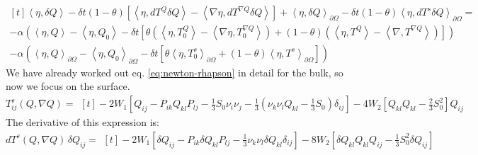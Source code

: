 \documentclass[reqno]{article}
\begin{document}
\begin{equation}
\begin{multlined}[t]
    \left<\eta, \delta Q\right> 
    - \delta t \left(1 - \theta \right) \left[
        \left<\eta, dT^Q \delta Q\right> 
        - \left<\nabla \eta, dT^{\nabla Q} \delta Q \right>
    \right] 
    + \left<\eta, \delta Q\right>_{\partial \Omega}
    - \delta t \left(1 - \theta \right) \left< \eta, dT^s \delta Q \right>_{\partial \Omega}
    = \\
    - \alpha \left( 
        \left<\eta, Q\right> - \left<\eta, Q_0\right> - \delta t \left[ 
            \theta \left(\left<\eta, T_0^Q\right> - \left<\nabla \eta, T_0^{\nabla Q} \right> \right)
            + \left(1 - \theta \right) \left( \left<\eta, T^Q\right> - \left<\nabla, T^{\nabla Q} \right> \right)
        \right]
    \right) \\
    -
    \alpha \left(
        \left<\eta, Q\right>_{\partial \Omega} 
            - \left< \eta, Q_0 \right>_{\partial \Omega} 
            - \delta t \left[ 
                \theta \left<\eta, T_0^s\right>_{\partial \Omega} 
                + \left(1 - \theta\right) \left< \eta, T^s \right>_{\partial \Omega} 
            \right] 
    \right)
\end{multlined}
\end{equation}
We have already worked out eq. \eqref{eq:newton-rhapson} in detail for the bulk, so now we focus on the surface.
\begin{equation}
    T^s_{ij}(Q, \nabla Q)
    =
    \begin{multlined}[t]
        -2 W_1 \left[
            Q_{ij} 
            - P_{ik} Q_{kl} P_{lj} 
            - \frac13 S_0 \nu_i \nu_j 
            - \frac13 \left( \nu_k \nu_l Q_{kl} - \frac13 S_0 \right) \delta_{ij}
        \right] 
        - 4 W_2 \left[ 
            Q_{kl} Q_{kl}
            - \frac23 S_0^2
        \right] Q_{ij}
    \end{multlined}
\end{equation}
The derivative of this expression is:
\begin{equation}
    dT^s(Q, \nabla Q) \, \delta Q_{ij}
    =
    \begin{multlined}[t]
        -2 W_1 \left[
            \delta Q_{ij} 
            - P_{ik} \delta Q_{kl} P_{lj} 
            - \frac13 \nu_k \nu_l \delta Q_{kl} \delta_{ij}
        \right]
        - 8 W_2 \left[ 
            \delta Q_{kl} Q_{kl} Q_{ij}
            - \frac13 S_0^2 \delta Q_{ij}
        \right] 
    \end{multlined}
\end{equation}
\end{document}
